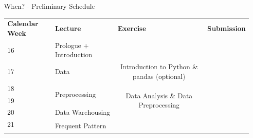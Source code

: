\begin{frame}{When? - Preliminary Schedule}
	\footnotesize
	\centering
	\begin{tabular}{|p{4em}|p{15em}|p{9.5em}|p{9.5em}|p{10em}|}
		\hline
		\rowcolor{faugray!62}\textbf{Calendar Week} & \textbf{Lecture}                                                                                                                 & \multicolumn{2}{|l|}{\textbf{Exercise}}                                         & \textbf{Submission}                                \\ \hhline{*{5}{:=}:}
		\cellcolor{faugray!25}16                    & Prologue + Introduction                                                                                                          & \multicolumn{2}{|l|}{\cellcolor{gray!50}}                                       & \cellcolor{gray!50}                                \\ \hhline{|-|-|--|-|}
		\cellcolor{faugray!25}17                    & Data                                                                                                                             & \multicolumn{2}{|c|}{Introduction to Python \& pandas {\color{gray}(optional)}} & \cellcolor{gray!50}                                \\ \hhline{|-|-|--|-|}
		\cellcolor{faugray!25}18                    & \multirow{2}{*}{Preprocessing}                                                                                                   & \multicolumn{2}{|c|}{\multirow{3}{*}{Data Analysis \& Data Preprocessing}}      & \cellcolor{gray!50}                                \\ \hhline{|-|~|~~|-|}
		\cellcolor{faugray!25}19                    &                                                                                                                                  & \multicolumn{2}{|l|}{}                                                          & \cellcolor{gray!50}                                \\ \hhline{|-|-|~~|-|}
		\cellcolor{faugray!25}20                    & Data Warehousing                                                                                                                 & \multicolumn{2}{|l|}{}                                                          & \cellcolor{gray!50}                                \\ \hhline{|-|-|--|-|}
		\cellcolor{faugray!25}21                    & \multirow{2}{*}{Frequent Pattern}                                                                                                & \multicolumn{2}{|c|}{\cellcolor{gray!50}}                                       & \cellcolor{gray!50}                                \\ \hhline{|-|~|--|-|}

\end{tabular}
\end{frame}
